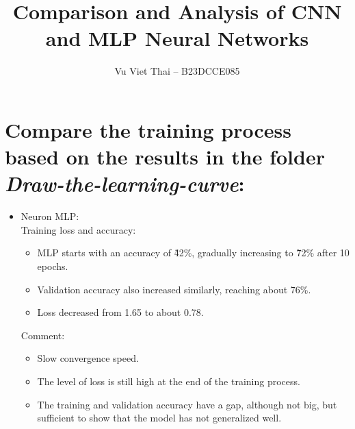 \documentclass[12pt]{article}
\title{Comparison and Analysis of CNN and MLP Neural Networks}
\author{Vu Viet Thai – B23DCCE085}
\date{}
\begin{document}
\maketitle

\section{Compare the training process based on the results in the folder 
\textit{Draw-the-learning-curve}:}

\begin{itemize}
    \item Neuron MLP:
    \\ Training loss and accuracy:

    \begin{itemize}
        \item MLP starts with an accuracy of \~42\%, gradually increasing to 
        \~72\% after 10 epochs.
        \item Validation accuracy also increased similarly, reaching about 
        76\%.
        \item Loss decreased from 1.65 to about 0.78.
    \end{itemize}

     Comment:

    \begin{itemize}
        \item Slow convergence speed.
        \item The level of loss is still high at the end of the training 
        process.
        \item The training and validation accuracy have a gap, although not 
        big, but sufficient to show that the model has not generalized well.
    \end{itemize}
    
\end{itemize}
\end{document}
